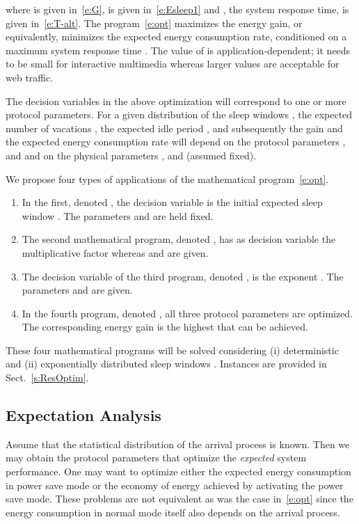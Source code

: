 \documentclass[journal]{IEEEtran}
\begin{document}
where  is given in~\eqref{e:G},  is given in~\eqref{e:Esleep1} and , the system response time, is given in~\eqref{e:T-alt}. The program~\eqref{e:opt} maximizes the energy gain, or equivalently, minimizes the expected energy consumption rate, conditioned on a maximum system response time . The value of  is application-dependent; it needs to be small for interactive multimedia whereas larger values are acceptable for web traffic.

The decision variables in the above optimization will correspond to one or more protocol parameters. For a given distribution of the sleep windows , the expected number of vacations , the expected idle period , and subsequently the gain  and the expected energy consumption rate  will depend on the protocol parameters ,  and  and on the physical parameters ,  and  (assumed fixed).

We propose four types of applications of the mathematical program~\eqref{e:opt}.
\begin{enumerate}
\item In the first, denoted , the decision variable is the
initial expected sleep window . The parameters  and 
are held fixed.
\item The second mathematical program, denoted , has as
decision variable the multiplicative factor  whereas 
and  are given.
\item The decision variable of the third program, denoted , is the exponent . The parameters  and  are
given.
\item In the fourth program, denoted , all three protocol
parameters are optimized. The corresponding energy gain  is the
highest that can be achieved.
\end{enumerate}
These four mathematical programs will be solved considering (i)
deterministic and (ii) exponentially distributed sleep windows
. Instances are provided in Sect.~\ref{s:ResOptim}.

\subsection{Expectation Analysis}
\label{s:exp}
Assume that the statistical distribution of the arrival process is known. Then we may obtain the protocol parameters that optimize the {\em expected} system performance. One may want to optimize either the
expected energy consumption in power save mode or the economy of energy achieved by activating the power save mode. These problems are not equivalent as was the case in~\eqref{e:opt} since the energy
consumption in normal mode itself also depends on the arrival process.
\end{document}

